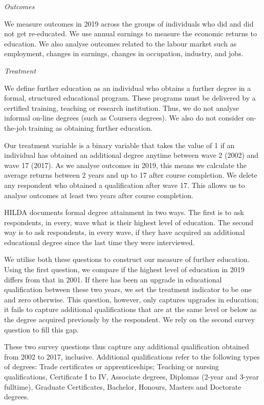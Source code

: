\documentclass[12pt, a4paper]{article}
\begin{document}
\emph{Outcomes}

We measure outcomes in 2019 across the groups of individuals who did and did not get re-educated. We use annual earnings to measure the economic returns to education. We also analyse  outcomes related to the labour market such as employment, changes in earnings, changes in occupation, industry, and jobs.

 


\emph{Treatment}

We define further education as an individual who obtains a further degree in a formal, structured educational program. These programs must be delivered by a certified training, teaching or research institution. Thus, we do not analyse informal on-line degrees (such as Coursera degrees). We also do not consider on-the-job training as obtaining further education.

Our treatment variable is a binary variable that takes the value of 1 if an individual has obtained an additional degree anytime between wave 2 (2002) and wave 17 (2017). As we analyse outcomes in 2019, this means we calculate the average returns between 2 years and up to 17 after course completion. We delete any respondent who obtained a qualification after wave 17. This allows us to analyse outcomes at least two years after course completion.

HILDA documents formal degree attainment in two ways. The first is to ask respondents, in every, wave what is their highest level of education. The second way is to ask respondents, in every wave, if they have acquired an additional educational degree since the last time they were interviewed.

We utilise both these questions to construct our measure of further education. Using the first question, we compare if the highest level of education in 2019 differs from that in 2001. If there has been an upgrade in educational qualification between these two years, we set the treatment indicator to be one and zero otherwise. This question, however, only captures upgrades in education; it fails to capture additional qualifications that are at the same level or below as the degree acquired previously by the respondent. We rely on the second survey question to fill this gap.

These two survey questions thus capture any additional qualification obtained from 2002 to 2017, inclusive. Additional qualifications refer to the following types of degrees: Trade certificates or apprenticeships; Teaching or nursing qualifications, Certificate I to IV, Associate degrees, Diplomas (2-year and 3-year fulltime), Graduate Certificates, Bachelor, Honours, Masters and Doctorate degrees.
\end{document}
